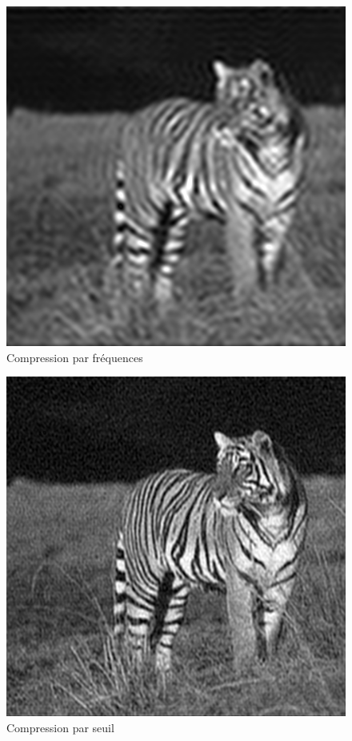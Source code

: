 \documentclass{article}
\begin{document}
\begin{figure}
	\begin{center}
		\includegraphics[scale=0.4]{tigre_compresse}\\
		Compression par fréquences
	\end{center}
\end{figure}
\begin{figure}
	\begin{center}
		\includegraphics[scale=0.4]{tigre_compresse_seuil}\\
		Compression par seuil
	\end{center}
\end{figure}
\end{document}

